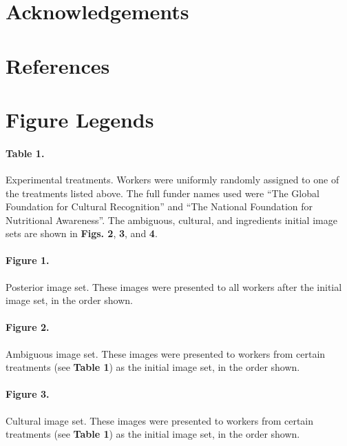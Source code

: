 \documentclass[a4paper]{report}
\begin{document}
\section*{Acknowledgements}
\section*{References}
\begingroup
\renewcommand{\chapter}[2]{}

\endgroup
 

\section*{Figure Legends}

\paragraph{Table 1.}
	Experimental treatments.  Workers were uniformly randomly
	assigned to one of the treatments listed above.  The full funder 
	names used were ``The Global Foundation
	for Cultural Recognition'' and ``The National Foundation for 
	Nutritional Awareness''.  The ambiguous, cultural, and ingredients 
	initial image sets are shown in \textbf{Figs. 2}, \textbf{3}, and 
	\textbf{4}.

\paragraph{Figure 1.}
	Posterior image set. These images were presented to all workers after the 
	initial image set, in the order shown. 

\paragraph{Figure 2.}
	Ambiguous image set. These images were presented to workers from certain
	treatments (see \textbf{Table 1}) as the initial image set, in the order 
	shown.  

\paragraph{Figure 3.}
	Cultural image set. These images were presented to workers from 
	certain treatments (see \textbf{Table 1}) as the initial image set, in the 
	order shown.  
\end{document}

